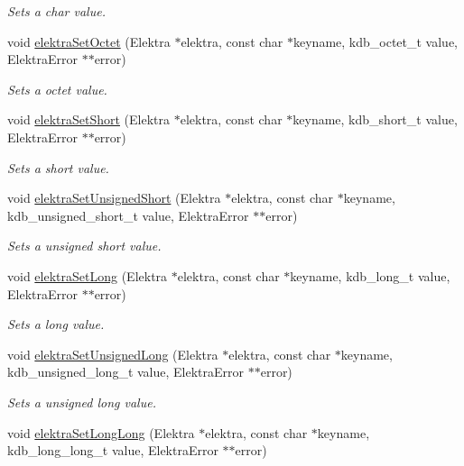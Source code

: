 \begin{DoxyCompactItemize}
\begin{DoxyCompactList}\small\item\em Sets a char value. \end{DoxyCompactList}\item 
void \hyperlink{group__highlevel_ga8ad9e3df6cf7868a38604d29122f4e21}{elektra\+Set\+Octet} (Elektra $\ast$elektra, const char $\ast$keyname, kdb\+\_\+octet\+\_\+t value, Elektra\+Error $\ast$$\ast$error)
\begin{DoxyCompactList}\small\item\em Sets a octet value. \end{DoxyCompactList}\item 
void \hyperlink{group__highlevel_ga067b1785a444fd98349e0e2b9f43ce3e}{elektra\+Set\+Short} (Elektra $\ast$elektra, const char $\ast$keyname, kdb\+\_\+short\+\_\+t value, Elektra\+Error $\ast$$\ast$error)
\begin{DoxyCompactList}\small\item\em Sets a short value. \end{DoxyCompactList}\item 
void \hyperlink{group__highlevel_gaf2e211a564bd082715e3256ceaf5e1c3}{elektra\+Set\+Unsigned\+Short} (Elektra $\ast$elektra, const char $\ast$keyname, kdb\+\_\+unsigned\+\_\+short\+\_\+t value, Elektra\+Error $\ast$$\ast$error)
\begin{DoxyCompactList}\small\item\em Sets a unsigned short value. \end{DoxyCompactList}\item 
void \hyperlink{group__highlevel_gaf2564ca6e0e4440359074a0b59a02344}{elektra\+Set\+Long} (Elektra $\ast$elektra, const char $\ast$keyname, kdb\+\_\+long\+\_\+t value, Elektra\+Error $\ast$$\ast$error)
\begin{DoxyCompactList}\small\item\em Sets a long value. \end{DoxyCompactList}\item 
void \hyperlink{group__highlevel_ga7f0fef70748854e222db829050079136}{elektra\+Set\+Unsigned\+Long} (Elektra $\ast$elektra, const char $\ast$keyname, kdb\+\_\+unsigned\+\_\+long\+\_\+t value, Elektra\+Error $\ast$$\ast$error)
\begin{DoxyCompactList}\small\item\em Sets a unsigned long value. \end{DoxyCompactList}\item 
void \hyperlink{group__highlevel_gaa91c0a9b907afdb1f8b202804be36f6f}{elektra\+Set\+Long\+Long} (Elektra $\ast$elektra, const char $\ast$keyname, kdb\+\_\+long\+\_\+long\+\_\+t value, Elektra\+Error $\ast$$\ast$error)

\end{DoxyCompactItemize}
